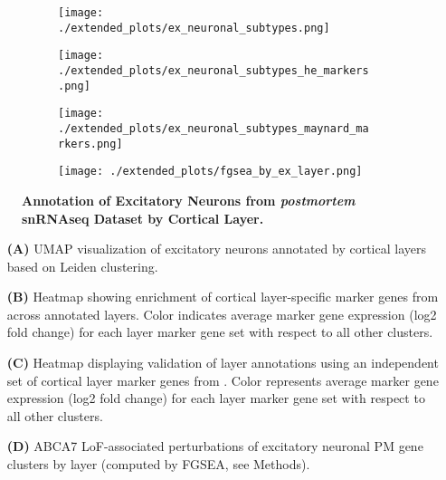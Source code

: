 \begin{figure}[H]
    \begin{subfigure}[t]{.3\textwidth}
        \caption{}
        \texttt{[image: ./extended\_plots/ex\_neuronal\_subtypes.png]}        
    \end{subfigure}
    \begin{subfigure}[t]{.3\textwidth}
        \caption{}
        \texttt{[image: ./extended\_plots/ex\_neuronal\_subtypes\_he\_markers.png]}        
    \end{subfigure}
    \begin{subfigure}[t]{.3\textwidth}
        \caption{}
        \texttt{[image: ./extended\_plots/ex\_neuronal\_subtypes\_maynard\_markers.png]}        
    \end{subfigure}
    \begin{subfigure}[t]{0.8\textwidth}
        \caption{}
        \texttt{[image: ./extended\_plots/fgsea\_by\_ex\_layer.png]}        
    \end{subfigure}
    \caption{
        \textbf{Annotation of Excitatory Neurons from \textit{postmortem} snRNAseq Dataset by Cortical Layer.}\\
    }
    \label{fig:ex_layers}
\end{figure}
\begin{itemize}
    \item[\textbf{(A)}] UMAP visualization of excitatory neurons annotated by cortical layers based on Leiden clustering. 
    \item[\textbf{(B)}] Heatmap showing enrichment of cortical layer-specific marker genes from \cite{He2017-dq} across annotated layers. Color indicates average marker gene expression (log2 fold change) for each layer marker gene set with respect to all other clusters.    
    \item[\textbf{(C)}] Heatmap displaying validation of layer annotations using an independent set of cortical layer marker genes from \cite{Maynard2021-mz}. Color represents average marker gene expression (log2 fold change) for each layer marker gene set with respect to all other clusters.
    \item[\textbf{(D)}] ABCA7 LoF-associated perturbations of excitatory neuronal PM gene clusters by layer (computed by FGSEA, see Methods).
\end{itemize}